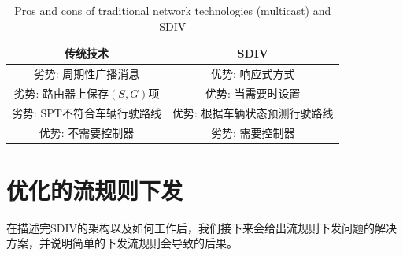\documentclass{ctexart}
\begin{document}

\begin{table}[t]
 \caption{\label{table1}Pros and cons of traditional network technologies (multicast) and SDIV}
 \centering
 \begin{tabular}{c|c}
  \hline
  传统技术 & SDIV \\
  \hline
  \hline
  劣势: 周期性广播消息 & 优势: 响应式方式 \\
 \hline
 劣势: 路由器上保存$(S,G)$项& 优势: 当需要时设置 \\
 \hline
 劣势: SPT不符合车辆行驶路线 & 优势: 根据车辆状态预测行驶路线\\
  \hline
  优势: 不需要控制器 & 劣势: 需要控制器 \\
  \hline
 \end{tabular}
\end{table}

\section{优化的流规则下发}

在描述完SDIV的架构以及如何工作后，我们接下来会给出流规则下发问题的解决方案，并说明简单的下发流规则会导致的后果。

\end{document}
